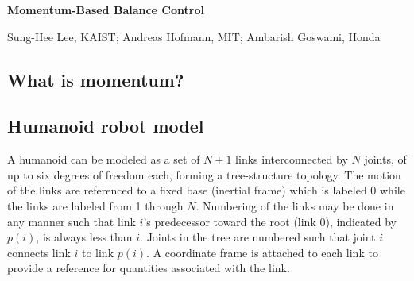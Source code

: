 \documentclass{llncs}
\def\title#1{{\noindent\Large{\bf #1}\par}}
\def\author#1{\begin{center}{\sc #1\par}\end{center}}
\renewcommand{\section}[1]{\vspace{0.1in}\noindent{\large\bf{#1}}\par\vspace{.05in}\par\nopagebreak}
\begin{document}
\pagestyle{empty}

\title{Momentum-Based Balance Control}
\author{Sung-Hee Lee, KAIST; Andreas Hofmann, MIT; Ambarish Goswami, Honda}

\section{Introduction}

\subsection{What is momentum?}



\subsection{Humanoid robot model}
\label{sn}

A humanoid can be modeled as a set of $N+1$ links interconnected by $N$ joints,
of up to six degrees of freedom each, forming a tree-structure topology.
The motion of the links are referenced to a fixed base (inertial frame)
which is labeled 0 while the links are labeled from 1 through $N$.
Numbering of the links may be done in any manner such that link $i$'s
predecessor toward the root (link 0), indicated by $p(i)$, is always
less than $i$.  Joints in the tree are numbered such that joint $i$
connects link $i$ to link $p(i)$.  A coordinate frame is attached to each
link to provide a reference for quantities associated with the link.
\end{document}

